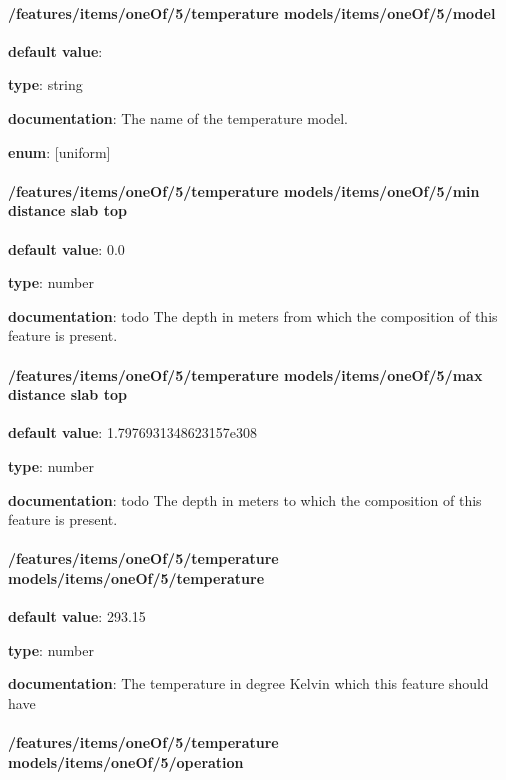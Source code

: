 \paragraph{/features/items/oneOf/5/temperature models/items/oneOf/5/model} \begin{itemized}
\item {\bf default value}: 
\item {\bf type}: string
\item {\bf documentation}: The name of the temperature model.
\item {\bf enum}: [uniform]\end{itemized}\paragraph{/features/items/oneOf/5/temperature models/items/oneOf/5/min distance slab top} \begin{itemized}
\item {\bf default value}: 0.0
\item {\bf type}: number
\item {\bf documentation}: todo The depth in meters from which the composition of this feature is present.
\end{itemized}\paragraph{/features/items/oneOf/5/temperature models/items/oneOf/5/max distance slab top} \begin{itemized}
\item {\bf default value}: 1.7976931348623157e308
\item {\bf type}: number
\item {\bf documentation}: todo The depth in meters to which the composition of this feature is present.
\end{itemized}\paragraph{/features/items/oneOf/5/temperature models/items/oneOf/5/temperature} \begin{itemized}
\item {\bf default value}: 293.15
\item {\bf type}: number
\item {\bf documentation}: The temperature in degree Kelvin which this feature should have
\end{itemized}\paragraph{/features/items/oneOf/5/temperature models/items/oneOf/5/operation} \begin{itemized}

\end{itemized}
